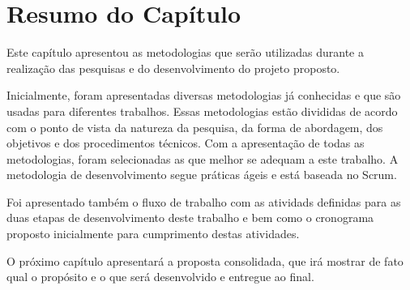 \section{Resumo do Capítulo}

Este capítulo apresentou as metodologias que serão utilizadas durante a realização das pesquisas e do desenvolvimento do projeto proposto.

Inicialmente, foram apresentadas diversas metodologias já conhecidas e que são usadas para diferentes trabalhos. Essas metodologias estão divididas de acordo com o ponto de vista da natureza da pesquisa, da forma de abordagem, dos objetivos e dos procedimentos técnicos. Com a apresentação de todas as metodologias, foram selecionadas as que melhor se adequam a este trabalho. A metodologia de desenvolvimento segue práticas ágeis e está baseada no Scrum.

Foi apresentado também o fluxo de trabalho com as atividads definidas para as duas etapas de desenvolvimento deste trabalho e bem como o cronograma proposto inicialmente para cumprimento destas atividades.

O próximo capítulo apresentará a proposta consolidada, que irá mostrar de fato qual o propósito e o que será desenvolvido e entregue ao final.
